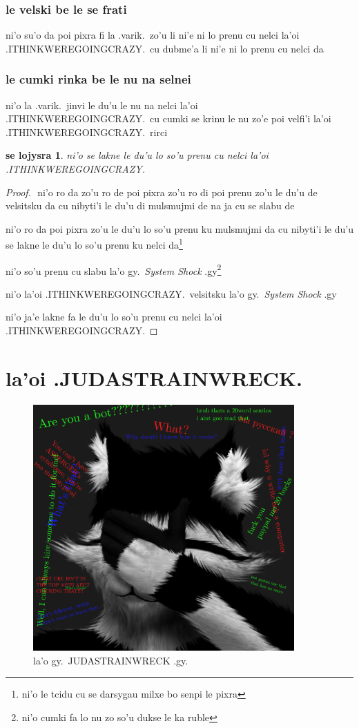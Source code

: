 \documentclass{report}
\newtheorem{thm}{se lojysra}
\begin{document}
\subsection{le velski be le se frati}
ni'o su'o da poi pixra fi la .varik.\ zo'u li ni'e ni lo prenu cu nelci la'oi .ITHINKWEREGOINGCRAZY.\ cu dubme'a li ni'e ni lo prenu cu nelci da

\subsection{le cumki rinka be le nu na selnei}
ni'o la .varik.\ jinvi le du'u le nu na nelci la'oi .ITHINKWEREGOINGCRAZY.\ cu cumki se krinu le nu zo'e poi velfi'i la'oi .ITHINKWEREGOINGCRAZY.\ rirci

\begin{thm}
ni'o se lakne le du'u lo so'u prenu cu nelci la'oi .ITHINKWEREGOINGCRAZY.

\end{thm}
\begin{proof}
${}$
ni'o ro da zo'u ro de poi pixra zo'u ro di poi prenu zo'u le du'u de velsitsku da cu nibyti'i le du'u di mulsmujmi de na ja cu se slabu de

ni'o ro da poi pixra zo'u le du'u lo so'u prenu ku mulsmujmi da cu nibyti'i le du'u se lakne le du'u lo so'u prenu ku nelci da\footnote{ni'o le tcidu cu se darsygau milxe bo senpi le pixra}

ni'o so'u prenu cu slabu la'o gy.\ \textit{System Shock} .gy\footnote{ni'o cumki fa lo nu zo so'u dukse le ka ruble}

ni'o la'oi .ITHINKWEREGOINGCRAZY.\ velsitsku la'o gy.\ \textit{System Shock} .gy

ni'o ja'e lakne fa le du'u lo so'u prenu cu nelci la'oi .ITHINKWEREGOINGCRAZY.

\end{proof}
\chapter{la'oi .JUDASTRAINWRECK.}
\begin{figure}[ht]
	\centering
	\includegraphics[width=10cm]{judastrainwreck/judastrainwreck.png}
	\caption[center]{la'o gy.\ JUDASTRAINWRECK .gy.}
\end{figure}
\end{document}
